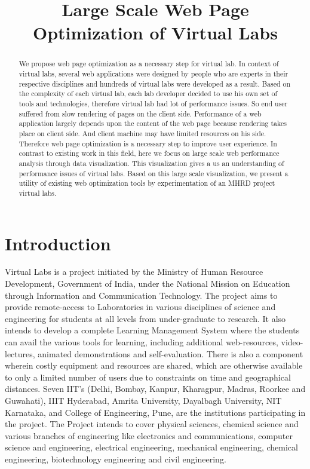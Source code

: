 \documentclass[conference]{IEEEtran}
\title{Large Scale Web Page Optimization of Virtual Labs}
\begin{document}
\maketitle

\begin{abstract}
We propose web page optimization as a necessary step for virtual lab.
In context of virtual labs, several web applications were designed by people who are 
experts in their respective disciplines and hundreds of virtual labs were developed as a result.
Based on the complexity of each virtual lab, each lab developer decided to use his own 
set of tools and technologies, therefore virtual lab had lot of performance issues.
So end user suffered from slow rendering of pages on the client side.
Performance of a web application largely depends upon the content of the web
page because rendering takes place on client side. 
And client machine may have limited resources on his side. Therefore web page
optimization is a necessary step to improve user experience.
In contrast to existing work in this field, here we focus on large scale web
performance analysis through data visualization. This visualization gives a
us an understanding of performance issues of virtual labs. Based on this large scale visualization,
we present a utility of existing web optimization tools by experimentation of an
MHRD project virtual labs.
\end{abstract}

\section{Introduction}\label{sec-2}
Virtual Labs is a project initiated by the Ministry of Human Resource Development, Government of India,
under the National Mission on Education through Information and Communication Technology.
The project aims to provide remote-access to Laboratories in various disciplines of science
and engineering for students at all levels from under-graduate to research.
It also intends to develop a complete Learning Management System where the students can avail the
various tools for learning, including additional web-resources, video-lectures, animated demonstrations
and self-evaluation. There is also a component wherein costly equipment and resources are shared, which
are otherwise available to only a limited number of users due to constraints on time and geographical distances.
Seven IIT's (Delhi, Bombay, Kanpur, Kharagpur, Madras, Roorkee and Guwahati), IIIT Hyderabad, Amrita University,
Dayalbagh University, NIT Karnataka, and College of Engineering, Pune, are the institutions participating in the project.
The Project intends to cover physical sciences, chemical science and various branches of engineering like electronics and
communications, computer science and engineering, electrical engineering, mechanical engineering, chemical engineering,
biotechnology engineering and civil engineering.
\end{document}
